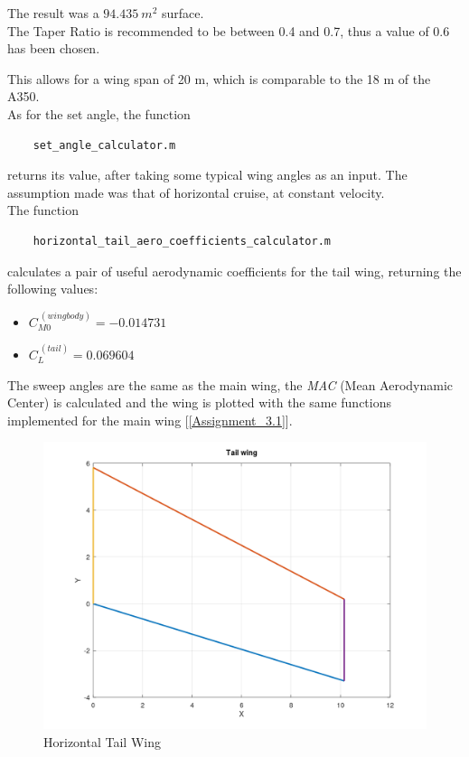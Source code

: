 \documentclass{article}
\begin{document}
The result was a $94.435 \ m^2$ surface. \\ 

The Taper Ratio is recommended to be between 0.4 and 0.7, thus a value of 0.6 has been chosen.

This allows for a wing span of 20 m, which is comparable to the 18 m of the A350. \\ 

As for the set angle, the function \autocite{Airbus_replacement_repo}

\begin{verbatim}
    set_angle_calculator.m
\end{verbatim}

returns its value, after taking some typical wing angles as an input. The assumption made was that of horizontal
cruise, at constant velocity. \\ 

The function 

\begin{verbatim}
    horizontal_tail_aero_coefficients_calculator.m
\end{verbatim}

calculates a pair of useful aerodynamic coefficients for the tail wing, returning the following values:

\begin{itemize}
    \item ${C_{M0}^{\ (wing body)} = -0.014731} $
    \item ${C_{L}^{\ (tail)}} = 0.069604$
\end{itemize}


\clearpage

The sweep angles are the same as the main wing, the \textit{MAC} (Mean Aerodynamic Center) is calculated
and the wing is plotted with the same functions implemented for the main wing [\ref{Assignment_3.1}].

\begin{figure}[h!]
    \centering
    \includegraphics[width=\textwidth]{Sources/Plots_and_Pictures/Tail_Wing.png}
    \caption{Horizontal Tail Wing}
    \label{Horizontal_tail}
\end{figure}
\end{document}
